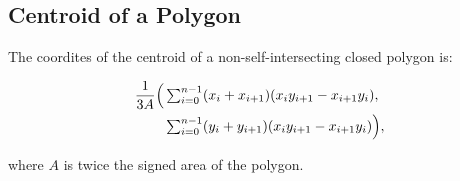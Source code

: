 \subsection{Centroid of a Polygon}

The coordites of the centroid of a non-self-intersecting closed polygon is:

\begin{align*}
\frac{1}{3A}\Bigl(&\textstyle\sum_{i=0}^{n-1}(x_i+x_{i+1})(x_iy_{i+1} - x_{i+1}y_i),\\
&\textstyle\sum_{i=0}^{n-1}(y_i+y_{i+1})(x_iy_{i+1} - x_{i+1}y_i)\Bigr),
\end{align*}

where $A$ is twice the signed area of the polygon.
